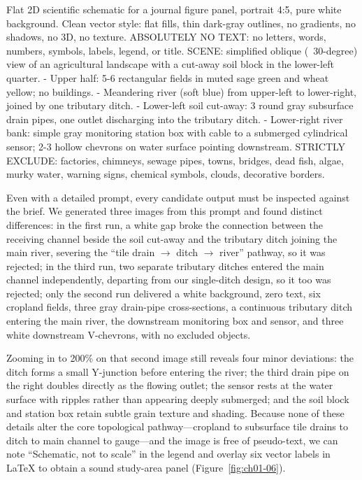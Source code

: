 \begin{Prompt}
Flat 2D scientific schematic for a journal figure panel, portrait 4:5, pure white
background. Clean vector style: flat fills, thin dark-gray outlines, no gradients,
no shadows, no 3D, no texture.
ABSOLUTELY NO TEXT: no letters, words, numbers, symbols, labels, legend, or title.
SCENE: simplified oblique (~30-degree) view of an agricultural landscape with a
cut-away soil block in the lower-left quarter.
- Upper half: 5-6 rectangular fields in muted sage green and wheat yellow; no buildings.
- Meandering river (soft blue) from upper-left to lower-right, joined by one tributary ditch.
- Lower-left soil cut-away: 3 round gray subsurface drain pipes, one outlet discharging
  into the tributary ditch.
- Lower-right river bank: simple gray monitoring station box with cable to a submerged
  cylindrical sensor; 2-3 hollow chevrons on water surface pointing downstream.
STRICTLY EXCLUDE: factories, chimneys, sewage pipes, towns, bridges, dead fish, algae,
murky water, warning signs, chemical symbols, clouds, decorative borders.
\end{Prompt}

Even with a detailed prompt, every candidate output must be inspected against the brief. We generated three images from this prompt and found distinct differences: in the first run, a white gap broke the connection between the receiving channel beside the soil cut-away and the tributary ditch joining the main river, severing the ``tile drain $\rightarrow$ ditch $\rightarrow$ river'' pathway, so it was rejected; in the third run, two separate tributary ditches entered the main channel independently, departing from our single-ditch design, so it too was rejected; only the second run delivered a white background, zero text, six cropland fields, three gray drain-pipe cross-sections, a continuous tributary ditch entering the main river, the downstream monitoring box and sensor, and three white downstream V-chevrons, with no excluded objects.

Zooming in to 200\% on that second image still reveals four minor deviations: the ditch forms a small Y-junction before entering the river; the third drain pipe on the right doubles directly as the flowing outlet; the sensor rests at the water surface with ripples rather than appearing deeply submerged; and the soil block and station box retain subtle grain texture and shading. Because none of these details alter the core topological pathway---cropland to subsurface tile drains to ditch to main channel to gauge---and the image is free of pseudo-text, we can note ``Schematic, not to scale'' in the legend and overlay six vector labels in LaTeX to obtain a sound study-area panel (Figure~\ref{fig:ch01-06}).


